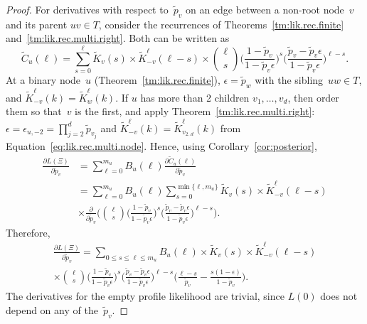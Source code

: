 \documentclass{elsarticle}
\newcommand{\nlik}{C}
\newcommand{\slik}{K}
\newcommand{\nolik}{B}
\newcommand{\nx}{u}
\newcommand{\ny}{v}
\newcommand{\nz}{w}
\begin{document}
\begin{proof}
For derivatives with respect to~$\tilde{p}_{\ny}$ on an edge between 
a non-root node~$\ny$ and its parent
$\nx\ny\in T$, 
consider the recurrences of Theorems~\ref{tm:lik.rec.finite} and~\ref{tm:lik.rec.multi.right}.
Both can be written as
\[
\tilde{\nlik}_{\nx}(\ell)
	= \sum_{s=0}^{\ell}
		\tilde{\slik}_{\ny}(s)
		\times \tilde{\slik}_{-\ny}^{\ell}(\ell-s)
		\times \binom{\ell}{s} 
			\biggl(\frac{1-\tilde{p}_{\ny}}{1-\tilde{p}_{\ny}\epsilon}\biggr)^s
			\biggl(\frac{\tilde{p}_{\ny}-\tilde{p}_{\ny}\epsilon}{1-\tilde{p}_{\ny}\epsilon}\biggr)^{\ell-s}.
\]
At a binary node~$\nx$ (Theorem~\ref{tm:lik.rec.finite}), 
$\epsilon = \tilde{p}_{\nz}$ with the sibling~$\nx\nz\in T$, and 
$\tilde{\slik}_{-\ny}^{\ell}(k)=\tilde{\slik}_{\nz}^{\ell}(k)$.
If $\nx$ has more than 2 children $\ny_1,\dotsc, \ny_d$, then order them so that~$\ny$ is the first, 
and apply Theorem~\ref{tm:lik.rec.multi.right}: 
$\epsilon = \epsilon_{\nx,-2} = \prod_{j=2}^d \tilde{p}_{\ny_j}$ and 
$\tilde{\slik}_{-\ny}^{\ell}(k)=\tilde{\slik}_{\ny_{2..d}}^{\ell}(k)$
from Equation~\eqref{eq:lik.rec.multi.node}. 
Hence, using Corollary~\ref{cor:posterior}, 
\begin{align*}
\frac{\partial L(\Xi) }{\partial \tilde{p}_{\ny}} 
	& = \sum_{\ell=0}^{m_{\nx}} \nolik_{\nx}(\ell)\frac{\partial \tilde{\nlik}_{\nx}(\ell)}{\partial \tilde{p}_{\ny}}
\\
	& = 
	\sum_{\ell=0}^{m_{\nx}}
	\nolik_{\nx}(\ell) 
\sum_{s=0}^{\min\{\ell,m_{\nx}\}}
		\tilde{\slik}_{\ny}(s) 
		\times \tilde{\slik}_{-\ny}^{\ell}(\ell-s)
		\\ & \times
		\frac{\partial}{\partial \tilde{p}_{\ny}}
	\Biggl(	\binom{\ell}{s} 
			\biggl(\frac{1-\tilde{p}_{\ny}}{1-\tilde{p}_{\ny}\epsilon}\biggr)^s
			\biggl(\frac{\tilde{p}_{\ny}-\tilde{p}_{\ny}\epsilon}{1-\tilde{p}_{\ny}\epsilon}\biggr)^{\ell-s}
			\Biggr).
\end{align*}
Therefore, 
\begin{multline}
\frac{\partial L(\Xi) }{\partial \tilde{p}_{\ny}} 
= \sum_{0\le s\le \ell\le m_{\nx}}
	\nolik_{\nx}(\ell) 
		\times
			\tilde{\slik}_{\ny}(s) 
		\times \tilde{\slik}_{-\ny}^{\ell}(\ell-s)
\\		
		\times \binom{\ell}{s} 
		\biggl(\frac{1-\tilde{p}_{\ny}}{1-\tilde{p}_{\ny}\epsilon}\biggr)^s
			\biggl(\frac{\tilde{p}_{\ny}-\tilde{p}_{\ny}\epsilon}{1-\tilde{p}_{\ny}\epsilon}\biggr)^{\ell-s}
			 \biggl(\frac{\ell-s}{\tilde{p}_{\ny}}-\frac{s(1-\epsilon)}{1-\tilde{p}_{\ny}}\biggr).
\end{multline}
The derivatives for the empty profile likelihood are trivial, since $L(0)$ does not depend on
any of the~$\tilde{p}_{\ny}$.



\end{proof}
\end{document}
